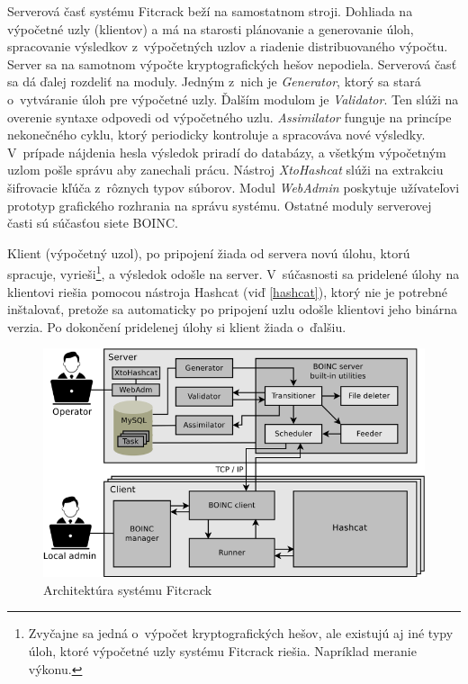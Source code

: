 \documentclass[../projekt.tex]{subfiles}
\begin{document}
Serverová časť systému Fitcrack beží na samostatnom stroji. Dohliada na výpočetné uzly (klientov) a má na starosti plánovanie a generovanie úloh, spracovanie výsledkov z~výpočetných uzlov a riadenie distribuovaného výpočtu. Server sa na samotnom výpočte kryptografických hešov nepodiela. Serverová časť sa dá ďalej rozdeliť na moduly. Jedným z~nich je \textit{Generator}, ktorý sa stará o~vytváranie úloh pre výpočetné uzly. Ďalším modulom je \textit{Validator}. Ten slúži na overenie syntaxe odpovedi od výpočetného uzlu. \textit{Assimilator} funguje na princípe nekonečného cyklu, ktorý periodicky kontroluje a spracováva nové výsledky. V~prípade nájdenia hesla výsledok priradí do databázy, a všetkým výpočetným uzlom pošle správu aby zanechali prácu. Nástroj \textit{XtoHashcat} slúži na extrakciu šifrovacie kľúča z~rôznych typov súborov. Modul \textit{WebAdmin} poskytuje užívateľovi prototyp grafického rozhrania na správu systému. Ostatné moduly serverovej časti sú súčasťou siete BOINC.

Klient (výpočetný uzol), po pripojení žiada od servera novú úlohu, ktorú spracuje, vyrieši\footnote{Zvyčajne sa jedná o~výpočet kryptografických hešov, ale existujú aj iné typy úloh, ktoré výpočetné uzly systému Fitcrack riešia. Napríklad meranie výkonu.}, a výsledok odošle na server. V~súčasnosti sa pridelené úlohy na klientovi riešia pomocou nástroja Hashcat (viď \ref{hashcat}), ktorý nie je potrebné inštalovať, pretože sa automaticky po pripojení uzlu odošle klientovi jeho binárna verzia. Po dokončení pridelenej úlohy si klient žiada o~ďalšiu.


\begin{figure}[h]
    \centering
    \includegraphics[scale=0.5]{obrazky/fitcrack_arch_web.png}
    \caption{Architektúra systému Fitcrack \cite{fitcrackSprava}}
    \label{fig:archFitcrack}
\end{figure}
\end{document}
